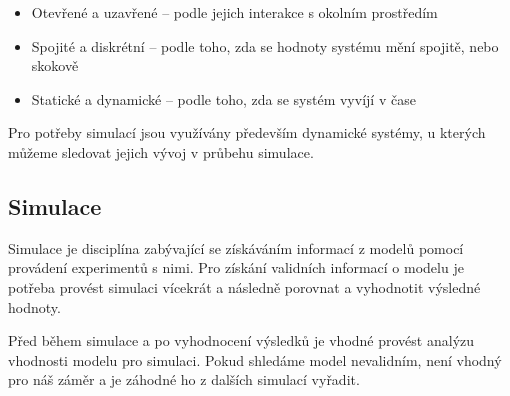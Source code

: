 \begin{itemize}
    \item Otevřené a uzavřené -- podle jejich interakce s okolním prostředím
    \item Spojité a diskrétní -- podle toho, zda se hodnoty systému mění spojitě, nebo skokově
    \item Statické a dynamické -- podle toho, zda se systém vyvíjí v čase
\end{itemize}
Pro potřeby simulací jsou využívány především dynamické systémy, u kterých můžeme sledovat jejich vývoj v průbehu simulace.

\subsection{Simulace}
Simulace je disciplína zabývající se získáváním informací z modelů pomocí provádení experimentů s nimi. Pro získání validních informací o modelu je potřeba provést simulaci vícekrát a následně porovnat a vyhodnotit výsledné hodnoty. 

Před během simulace a po vyhodnocení výsledků je vhodné provést analýzu vhodnosti modelu pro simulaci. Pokud shledáme model nevalidním, není vhodný pro náš záměr a je záhodné ho z dalších simulací vyřadit.


